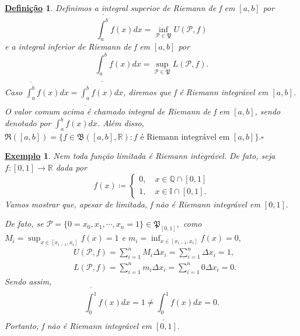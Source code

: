 \documentclass{article}
\newtheorem*{def*}{\underline{Defini\c c\~ao}}
\newtheorem{example}{\underline{Exemplo}}
\begin{document}
\begin{def*}
  Definimos a integral superior de Riemann de f em \([a, b]\) por 
    \[
      \overline{\int_{a}^{b}}f(x)dx = \inf_{\mathcal{P}\in \mathfrak{P}}U(\mathcal{P}, f)
    \]
  e a integral inferior de Riemann de f em \([a, b]\) por 
    \[
      \underline{\int_{a}^{b}}f(x)dx = \sup_{\mathcal{P}\in \mathfrak{P}}L(\mathcal{P}, f).
    \]
  Caso \(\overline{\int_{a}^{b}}f(x)dx = \underline{\int_{a}^{b}}f(x)dx\), diremos que f é Riemann
  integrável em \([a, b]\). O valor comum acima é chamado integral de Riemann de f em
  \([a, b]\), sendo denotado por \(\int_{a}^{b}f(x)dx\). Além disso,
  \(\mathfrak{R}([a, b]) = \{f\in \mathfrak{B}([a, b], \mathbb{R}): f\text{ é Riemann integrável em }[a, b]\}.\square\)
\end{def*}
\begin{example}
  Nem toda fun\c cão limitada é Riemann integrável. De fato, seja \(f:[0, 1]\rightarrow \mathbb{R}\) dada por 
    \[
      f(x) \coloneqq  \left\{\begin{array}{ll}
          0,\quad x\in \mathbb{Q}\cap{[0, 1]}\\
          1,\quad x\in \mathbb{I}\cap{[0, 1]}.
        \end{array}\right.
    \]
    Vamos mostrar que, apesar de limitada, f não é Riemann integrável em \([0, 1].\)

  De fato, se \(\mathcal{P} = \{0 = x_{0}, x_{1}, \cdots, x_{n} = 1\}\in \mathfrak{P}_{[0, 1]},\) como \(M_{i}=\sup_{x\in[x_{i-1}, x_{i}]} f(x) = 1\)
  e \(m_{i} = \inf_{x\in[x_{i-1}, x_{i}]}f(x) = 0,\) 
 \begin{align*}
   &U(\mathcal{P}, f) = \sum\limits_{i=1}^{n}M_{i}\Delta x_{i} = \sum\limits_{i=1}^{n}\Delta x_{i} =1,\\
   &L(\mathcal{P}, f) = \sum\limits_{i=1}^{n}m_{i}\Delta x_{i} = \sum\limits_{i=1}^{n}0\Delta x_{i} = 0.
 \end{align*}
 Sendo assim, 
   \[
     \overline{\int_{0}^{1}}f(x)dx = 1\neq \underline{\int_{0}^{1}}f(x)dx = 0.
   \]
   Portanto, f não é Riemann integrável em \([0, 1].\)
  \end{example}
\end{document}
